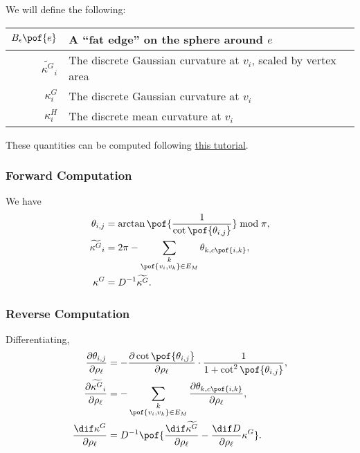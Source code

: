 
We will define the following: \begin{center}\begin{tabular}{r|l}
	\(B_{\epsilon}\pof{e}\) & A ``fat edge'' on the sphere around \(e\) \\ \hline
	\(\widetilde{\kappa^G}_i\) & The discrete Gaussian curvature at \(v_i\), scaled by vertex area \\ \hline
	\(\kappa^G_i\) & The discrete Gaussian curvature at \(v_i\) \\ \hline
	\(\kappa^H_i\) & The discrete mean curvature at \(v_i\)
\end{tabular}\end{center} These quantities can be computed following \href{https://libigl.github.io/libigl-python-bindings/tut-chapter1/}{this tutorial}.

\subsubsection{Forward Computation}
We have \begin{align*}
	\theta_{i, j} &= \arctan\pof{\frac{1}{\cot\pof{\theta_{i, j}}}} \bmod \pi, \\
	\widetilde{\kappa^G}_i &= 2\pi - \sum_{\substack{k \\ \pof{v_i, v_k} \in E_M}} \theta_{k, c\pof{i, k}}, \\
	\kappa^G &= D^{-1}\widetilde{\kappa^G}.
\end{align*}

\subsubsection{Reverse Computation}
Differentiating, \begin{align*}
	\frac{\partial\theta_{i, j}}{\partial\rho_\ell} &= -\frac{\partial \cot\pof{\theta_{i, j}}}{\partial \rho_\ell} \cdot \frac{1}{1 + \cot^2\pof{\theta_{i, j}}}, \\
	\frac{\partial\widetilde{\kappa^G}_i}{\partial\rho_\ell} &= -\sum_{\substack{k \\ \pof{v_i, v_k} \in E_M}} \frac{\partial\theta_{k, c\pof{i, k}}}{\partial\rho_\ell}, \\
	\frac{\dif\kappa^G}{\partial\rho_\ell} &= D^{-1}\pof{\frac{\dif\widetilde{\kappa^G}}{\partial\rho_\ell} - \frac{\dif D}{\partial\rho_\ell}\kappa^G}.
\end{align*}
